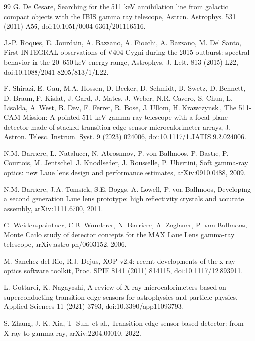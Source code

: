 \documentclass[preprint,12pt]{elsarticle}
\begin{document}
\begin{thebibliography}{99}
G. De Cesare, Searching for the 511 keV annihilation line from galactic compact objects with the IBIS gamma ray telescope, Astron. Astrophys. 531 (2011) A56, doi:10.1051/0004-6361/201116516.

J.-P. Roques, E. Jourdain, A. Bazzano, A. Fiocchi, A. Bazzano, M. Del Santo, First INTEGRAL observations of V404 Cygni during the 2015 outburst: spectral behavior in the 20--650 keV energy range, Astrophys. J. Lett. 813 (2015) L22, doi:10.1088/2041-8205/813/1/L22.

F. Shirazi, E. Gau, M.A. Hossen, D. Becker, D. Schmidt, D. Swetz, D. Bennett, D. Braun, F. Kislat, J. Gard, J. Mates, J. Weber, N.R. Cavero, S. Chun, L. Lisalda, A. West, B. Dev, F. Ferrer, R. Bose, J. Ullom, H. Krawczynski, The 511-CAM Mission: A pointed 511 keV gamma-ray telescope with a focal plane detector made of stacked transition edge sensor microcalorimeter arrays, J. Astron. Telesc. Instrum. Syst. 9 (2023) 024006, doi:10.1117/1.JATIS.9.2.024006.

N.M. Barriere, L. Natalucci, N. Abrosimov, P. von Ballmoos, P. Bastie, P. Courtois, M. Jentschel, J. Knodlseder, J. Rousselle, P. Ubertini, Soft gamma-ray optics: new Laue lens design and performance estimates, arXiv:0910.0488, 2009.

N.M. Barriere, J.A. Tomsick, S.E. Boggs, A. Lowell, P. von Ballmoos, Developing a second generation Laue lens prototype: high reflectivity crystals and accurate assembly, arXiv:1111.6700, 2011.

G. Weidenspointner, C.B. Wunderer, N. Barriere, A. Zoglauer, P. von Ballmoos, Monte Carlo study of detector concepts for the MAX Laue Lens gamma-ray telescope, arXiv:astro-ph/0603152, 2006.

M. Sanchez del Rio, R.J. Dejus, XOP v2.4: recent developments of the x-ray optics software toolkit, Proc. SPIE 8141 (2011) 814115, doi:10.1117/12.893911.

L. Gottardi, K. Nagayoshi, A review of X-ray microcalorimeters based on superconducting transition edge sensors for astrophysics and particle physics, Applied Sciences 11 (2021) 3793, doi:10.3390/app11093793.

S. Zhang, J.-K. Xia, T. Sun, et al., Transition edge sensor based detector: from X-ray to gamma-ray, arXiv:2204.00010, 2022.


\end{thebibliography}
\end{document}
